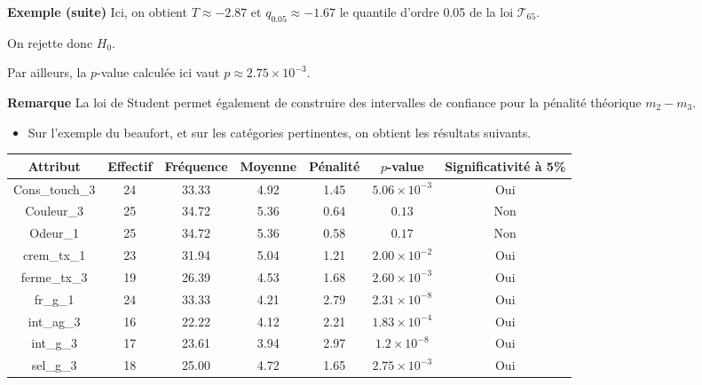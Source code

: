 \documentclass[aspectratio=169,xcolor=dvipsnames]{beamer}
\begin{document}
\begin{frame}	
	\begin{exampleblock}{\textbf{Exemple (suite)}}
	Ici, on obtient $T \approx -2.87$ et $q_{0.05} \approx -1.67 $ le quantile d'ordre 0.05 de la loi $\mathcal{T}_{65}$.
	
	\medskip
	
	On rejette donc $H_0$.
	
	\medskip
	
	Par ailleurs, la $p$-value calculée ici vaut $p \approx 2.75\times 10^{-3}$.
	\end{exampleblock}
	
	\begin{exampleblock}{\textbf{Remarque}}
	La loi de Student permet également de construire des intervalles de confiance pour la pénalité théorique $m_2-m_3$.
	\end{exampleblock}
\end{frame}
\begin{frame}
	\begin{scriptsize}
	\begin{itemize}
	\item Sur l'exemple du beaufort, et sur les catégories pertinentes, on obtient les résultats suivants.	
	\end{itemize}

	\begin{center}
	\begin{tabular}{ccccccc}
  \hline
Attribut & Effectif & Fréquence & Moyenne & Pénalité & $p$-value & Significativité à 5\% \\ 
  \hline 
Cons\_touch\_3 &  24 & 33.33 & 4.92 & 1.45 & $5.06\times 10^{-3}$ & Oui \\ 
Couleur\_3 &  25 & 34.72 & 5.36 & 0.64 & $0.13$ & Non \\ 
Odeur\_1 &  25 & 34.72 & 5.36 & 0.58 & $0.17$ & Non \\  
crem\_tx\_1 &  23 & 31.94 & 5.04 & 1.21 & $2.00\times 10^{-2}$ & Oui \\ 
ferme\_tx\_3 &  19 & 26.39 & 4.53 & 1.68 & $2.60\times 10^{-3}$ & Oui \\ 
fr\_g\_1 &  24 & 33.33 & 4.21 & 2.79 & $2.31\times 10^{-8}$ & Oui \\  
int\_ag\_3 &  16 & 22.22 & 4.12 & 2.21 & $1.83\times 10^{-4}$ & Oui \\ 
int\_g\_3 &  17 & 23.61 & 3.94 & 2.97 & $1.2\times 10^{-8}$ & Oui \\  
sel\_g\_3 &  18 & 25.00 & 4.72 & 1.65 & $2.75\times 10^{-3}$ & Oui \\ 
   \hline
	\end{tabular}
	\end{center}
	\end{scriptsize}
\end{frame}
\end{document}
